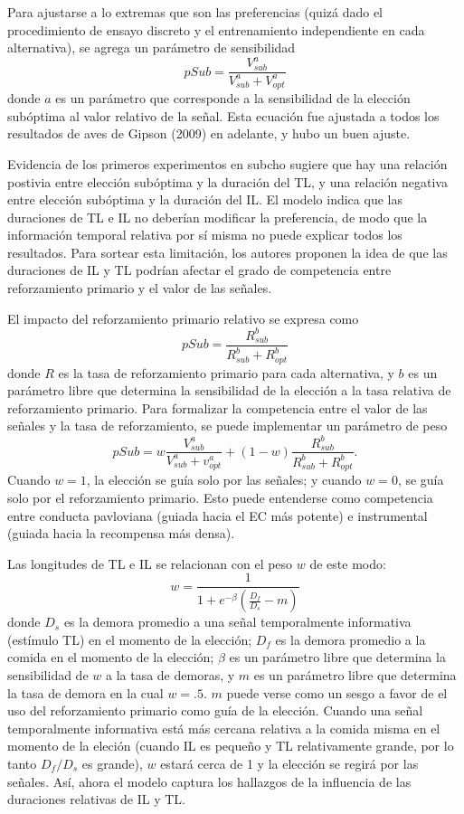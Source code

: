 \documentclass[a4paper,12pt]{article}
\begin{document}
Para ajustarse a lo extremas que son las preferencias (quizá dado el procedimiento de ensayo discreto y el entrenamiento independiente en cada alternativa), se agrega un parámetro de sensibilidad
$$
pSub=\frac{V^a_{sub}}{V^a_{sub}+V^a_{opt}}
$$
donde $a$ es un parámetro que corresponde a la sensibilidad de la elección subóptima al valor relativo de la señal. Esta ecuación fue ajustada a todos los resultados de aves de Gipson (2009) en adelante, y hubo un buen ajuste.

Evidencia de los primeros experimentos en subcho sugiere que hay una relación postivia entre elección subóptima y la duración del TL, y una relación negativa entre elección subóptima y la duración del IL. El modelo indica que las duraciones de TL e IL no deberían modificar la preferencia, de modo que la información temporal relativa por sí misma no puede explicar todos los resultados. Para sortear esta limitación, los autores proponen la idea de que las duraciones de IL y TL podrían afectar el grado de competencia entre reforzamiento primario y el valor de las señales.

El impacto del reforzamiento primario relativo se expresa como
$$
pSub=\frac{R^b_{sub}}{R^b_{sub}+R^b_{opt}}
$$
donde $R$ es la tasa de reforzamiento primario para cada alternativa, y $b$ es un parámetro libre que determina la sensibilidad de la elección a la tasa relativa de reforzamiento primario. Para formalizar la competencia entre el valor de las señales y la tasa de reforzamiento, se puede  implementar un parámetro de peso
$$
pSub=w\frac{V^a_{sub}}{V^a_{sub}+v^a_{opt}}
+
(1-w)\frac{R^b_{sub}}{R^b_{sub}+R^b_{opt}}.
$$
Cuando $w=1$, la elección se guía solo por las señales; y cuando $w=0$, se guía solo por el reforzamiento primario. Esto puede entenderse como competencia entre conducta pavloviana (guiada hacia el EC más potente) e instrumental (guiada hacia la recompensa más densa).

Las longitudes de TL e IL se relacionan con el peso $w$ de este modo: 
$$
w=\frac1{1+e^{-\beta}\left(\frac{D_f}{D_s}-m\right)}
$$
donde $D_s$ es la demora promedio a una señal temporalmente informativa (estímulo TL) en el momento de la elección; $D_f$ es la demora promedio a la comida en el momento de la elección; $\beta$ es un parámetro libre que determina la sensibilidad de $w$ a la tasa de demoras, y $m$ es un parámetro libre que determina la tasa de demora en la cual $w={.}5$. $m$ puede verse como un sesgo a favor de el uso del reforzamiento primario como guía de la elección. Cuando una señal temporalmente informativa está más cercana relativa a la comida misma en el momento de la eleción (cuando IL es pequeño y TL relativamente grande, por lo tanto $D_f/D_s$ es grande), $w$ estará cerca de 1 y la elección se regirá por las señales. Así, ahora el modelo captura los hallazgos de la influencia de las duraciones relativas de IL y TL.
\end{document}
